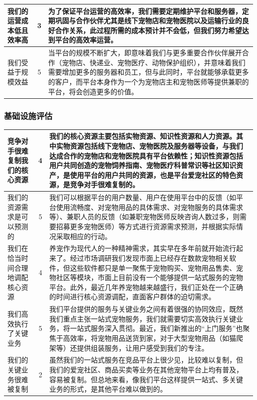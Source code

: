 \documentclass[a4paper]{ctexart}
\begin{document}
\begin{table}[h]
\begin{tabular}{|p{3.5cm}|c|p{10cm}|}
  \hline
  我们的运营成本低且效率高 & 3 & 为了保证平台运营的高效率，我们需要定期维护平台和服务器，定期巩固与合作伙伴尤其是线下宠物店和宠物医院以及运输行业的良好合作关系，此过程所需的成本预计并不会低，但我们努力希望达到平台的高效率运营。\\
  \hline
  我们受益于规模效益 & 5 & 当平台的规模不断扩大，即意味着我们与更多重要合作伙伴展开合作（宠物店、快递业、宠物医疗、动物保护组织），并意味着我们需要增加更多的服务器和员工，但与此同时，平台就能够承载更多的客户，而平台本身作为一个为宠物店主和宠物医师等提供兼职的平台，将会创造更多的价值。\\
  \hline
\end{tabular}
\end{table}

\FloatBarrier
\subsubsection{基础设施评估}
\begin{table}[h]
  \centering
\begin{tabular}{|p{3.5cm}|c|p{10cm}|}
  \hline
  竞争对手很难复制我们的核心资源 & 4 & 我们的核心资源主要包括实物资源、知识性资源和人力资源。其中实物资源包括线下宠物店、宠物医院及服务器等设备，与我们达成合作的宠物店和宠物医院具有平台依赖性；知识性资源包括用户共同创造的宠物饲养指南、宠物医疗科普常识等社区知识资产，是使用平台的用户共同的资源，也是平台爱宠社区的特色资源，是竞争对手很难复制的。\\
  \hline
  我们的资源需求是可以预测的 & 5 & 我们可以根据平台的用户数量、用户在使用平台中的反馈（如平台使用流畅度、对宠物用品的具体需求、对宠物服务的具体需求等）、兼职人员的反馈（如兼职宠物医师反映咨询人数过多，则需要招募更多宠物医师）等方式进行资源需求预测，并根据实际情况采取相应的行动。\\
  \hline
  我们在恰当时间合理地调配核心资源 & 4 & 养宠作为现代人的一种精神需求，其实早在多年前就开始流行起来了。经过市场调研我们发现市面上已经存在数款宠物相关软件，但这些软件都只是单一聚焦于宠物购买、宠物用品售卖、宠物社区等模块，市面上目前没有一个能够提供一站式服务的宠物平台。此外，最近几年养宠物越来越盛行，我们正处在一个正确的时间进行核心资源调配，直面客户群体的迫切需求。\\
  \hline
  我们高效执行了关键业务 & 5 & 我们平台提供的服务与关键业务之间有着很强的协同效应，既然我们重点主张一站式宠物服务，我们就需要切实高效执行关键业务，将一站式服务深入贯彻。最近，我们新推出的“上门服务”也聚焦于高效率，将宠物用品送货到家，对于大型宠物用品（如猫爬架等）还提供组装服务，让用户感受到我们的专注。\\
  \hline
  我们的关键业务很难被复制 & 2 & 虽然我们的一站式服务在竞品平台上很少见，比较难以复制，但我们的爱宠社区、商品买卖等业务在其他宠物平台上均有普及，容易被复制。但总地来看，像我们平台这样提供一站式、多关键业务的形式，是其他平台难以做到的。\\
  \hline
\end{tabular}
\end{table}
\end{document}
